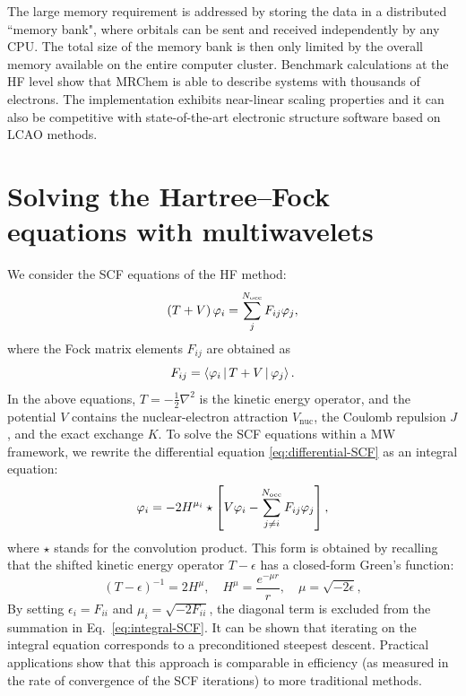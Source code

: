 \documentclass[journal=jctcce, manuscript=article]{achemso}
\begin{document}
The large memory requirement is addressed by storing the data in a distributed ``memory bank", where orbitals can be sent and received independently by any CPU. The total size of the memory bank is then only limited by the overall memory available on the entire computer cluster.
Benchmark calculations at the \ac{HF} level show that MRChem is able to describe systems with thousands of electrons. The implementation exhibits near-linear scaling properties and it can also be competitive with state-of-the-art electronic structure software based on \ac{LCAO} methods.

\section{Solving the Hartree--Fock equations with multiwavelets}

We consider the \ac{SCF} equations of the \ac{HF} method:
\begin{equation}\label{eq:differential-SCF}
  \left(T + V \right) \varphi_i = \sum_{j}^{N_{\mathrm{occ}}} F_{ij} \varphi_j,
\end{equation}
where the Fock matrix elements $F_{ij}$ are obtained as
\begin{equation}\label{eq:fock-matrix-definition}
  F_{ij} = \Braket{ {\varphi_i}|{T+V}|{\varphi_j}}.
\end{equation}
In the above equations, $T = -\frac{1}{2}\nabla^2$ is the kinetic
energy operator, and the potential $V$ contains the nuclear-electron
attraction $V_{\mathrm{nuc}}$, the Coulomb repulsion $J$, and the exact exchange $K$. 
To solve the \ac{SCF} equations within a \ac{MW} framework, we rewrite the differential equation \eqref{eq:differential-SCF} as an integral equation:
\begin{equation}\label{eq:integral-SCF}
\varphi_i = -2 H^{\mu_i}\star\left[V\varphi_i - \sum_{j \ne i}^{N_{\mathrm{occ}}} F_{ij} \varphi_j\right],
\end{equation}
where $\star$ stands for the convolution product.
This form is obtained by recalling that the shifted kinetic energy operator $T-\epsilon$ has a closed-form Green's function:\cite{Kalos1962-ok,Beylkin2005-kg}
\begin{equation}\label{eq:helmholtz-green}
    (T-\epsilon)^{-1} = 2 H^{\mu}, \quad H^{\mu} = \frac{e^{-\mu r}}{r}, \quad \mu = \sqrt{-2\epsilon},
\end{equation}
By setting $\epsilon_i = F_{ii}$ and $\mu_i = \sqrt{-2F_{ii}}$, the diagonal term is excluded from the summation in Eq.~\eqref{eq:integral-SCF}.
It can be shown that iterating on the integral equation corresponds to a preconditioned steepest descent. Practical applications show that this approach is comparable in efficiency (as measured in the rate of convergence of the \ac{SCF} iterations) to more traditional methods.\cite{Harrison2004-fs}
\end{document}
